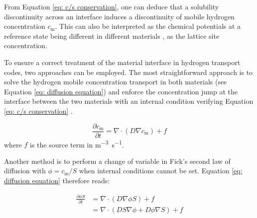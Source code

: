 From Equation \ref{eq: c/s conservation}, one can deduce that a solubility discontinuity across an interface induces a discontinuity of mobile hydrogen concentration $c_\mathrm{m}$.
This can also be interpreted as the chemical potentials at a reference state being different in different materials , as the lattice site concentration.


To ensure a correct treatment of the material interface in hydrogen transport codes, two approaches can be employed.
The most straightforward approach is to solve the hydrogen mobile concentration transport in both materials (see Equation \ref{eq: diffusion equation}) and enforce the concentration jump at the interface between the two materials with an internal condition verifying  Equation \ref{eq: c/s conservation} .

\begin{equation}
    \frac{\partial c_\mathrm{m}}{\partial t}=\nabla \cdot\left(D \nabla c_\mathrm{m}\right) + f
   \label{eq: diffusion equation}
\end{equation}
where $f$ is the source term in \si{m^{-3}.s^{-1}}.

Another method is to perform a change of variable in Fick's second law of diffusion with $\phi = c_\mathrm{m}/S$  when internal conditions cannot be set.
Equation \ref{eq: diffusion equation} therefore reads:

\begin{align}
    \frac{\partial \phi S}{\partial t} &= \nabla \cdot\left(D \nabla \phi S\right) + f \nonumber \\
    &=\nabla \cdot\left( D S \nabla \phi + D \phi \nabla S\right) + f \label{eq: diffusion equation changed}
\end{align}

